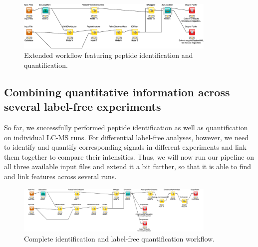\begin{figure}[htbp]
  \centering
  \includegraphics[width=0.85\textwidth]{graphics/labelfree/lfq_no_align}
  \caption{Extended workflow featuring peptide identification and quantification.}
  \label{fig:ff_idmapping}
\end{figure}

\subsection{Combining quantitative information across several label-free experiments}
\label{Combining}

So far, we successfully performed peptide identification as well as quantification on individual LC-MS runs. For differential label-free analyses, however, we need to identify and quantify corresponding signals in different experiments and link them together to compare their intensities. Thus, we will now run our pipeline on all three available input files and extend it a bit further, so that it is able to find and link features across several runs.

\begin{figure}[htbp]
  \centering
  \includegraphics[width=0.85\textwidth]{graphics/labelfree/lfq}
  \caption{Complete identification and label-free quantification workflow.}
  \label{fig:complete_without_consensusid}
\end{figure}

